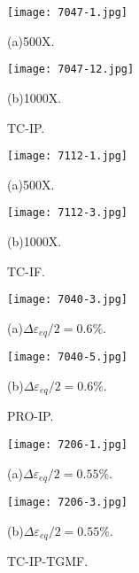 \begin{figure}
  \begin{minipage}[t]{0.5\linewidth}
  \nonumber
    \centering
    \texttt{[image: 7047-1.jpg]}
    \centerline{(a)500X.}
  \end{minipage}%
  \begin{minipage}[t]{0.5\linewidth}
    \centering
    \texttt{[image: 7047-12.jpg]}
    \centerline{(b)1000X.}
  \end{minipage}
  \caption{TC-IP.}
  \label{Fig:MicrostructureofInconel718}
\end{figure}

\begin{figure}
  \begin{minipage}[t]{0.5\linewidth}
  \nonumber
    \centering
    \texttt{[image: 7112-1.jpg]}
    \centerline{(a)500X.}
  \end{minipage}%
  \begin{minipage}[t]{0.5\linewidth}
    \centering
    \texttt{[image: 7112-3.jpg]}
    \centerline{(b)1000X.}
  \end{minipage}
  \caption{TC-IF.}
  \label{Fig:MicrostructureofInconel718}
\end{figure}

\begin{figure}
  \begin{minipage}[t]{0.5\linewidth}
  \nonumber
    \centering
    \texttt{[image: 7040-3.jpg]}
    \centerline{(a)$\Delta \varepsilon_{eq}/2=0.6\%$.}
  \end{minipage}%
  \begin{minipage}[t]{0.5\linewidth}
    \centering
    \texttt{[image: 7040-5.jpg]}
    \centerline{(b)$\Delta \varepsilon_{eq}/2=0.6\%$.}
  \end{minipage}
  \caption{PRO-IP.}
  \label{Fig:MicrostructureofInconel718}
\end{figure}

\begin{figure}
  \begin{minipage}[t]{0.5\linewidth}
  \nonumber
    \centering
    \texttt{[image: 7206-1.jpg]}
    \centerline{(a)$\Delta \varepsilon_{eq}/2=0.55\%$.}
  \end{minipage}%
  \begin{minipage}[t]{0.5\linewidth}
    \centering
    \texttt{[image: 7206-3.jpg]}
    \centerline{(b)$\Delta \varepsilon_{eq}/2=0.55\%$.}
  \end{minipage}
  \caption{TC-IP-TGMF.}
  \label{Fig:MicrostructureofInconel718}
\end{figure}

